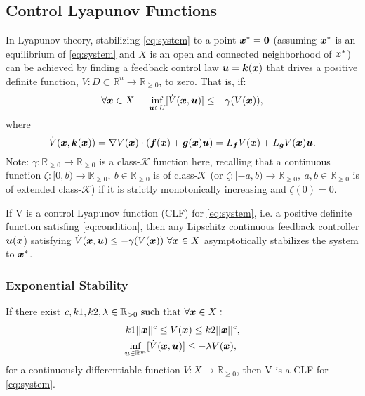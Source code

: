 \subsection{Control Lyapunov Functions}
In Lyapunov theory, stabilizing \eqref{eq:system} to a point $\boldsymbol{x}^*=\boldsymbol{0}$ (assuming 
$\boldsymbol{x}^*$ is an equilibrium of \eqref{eq:system} and 
$X$ is an open and connected neighborhood of $\boldsymbol{x}^*$) can be achieved by finding a feedback control law $\boldsymbol{u}=\boldsymbol{k}(\boldsymbol{x})$ that drives a positive definite function, $V: D \subset \mathbb{R}^n \to \mathbb{R}_{\geq 0}$, to zero. That is, if:
\begin{equation}
    \forall \boldsymbol{x}\in X ~~~~ \inf_{\boldsymbol{u}\in U}[\dot{V}(\boldsymbol{x},\boldsymbol{u})] \leq -\gamma(V(\boldsymbol{x})),
\label{eq:condition}
\end{equation}
where
\begin{equation}
    \dot{V}(\boldsymbol{x},\boldsymbol{k}(\boldsymbol{x})) = \nabla V(\boldsymbol{x})\cdot(\boldsymbol{f}(\boldsymbol{x})+\boldsymbol{g}(\boldsymbol{x})\boldsymbol{u})= L_{\boldsymbol{f}}V(\boldsymbol{x})+L_{\boldsymbol{g}}V(\boldsymbol{x})\boldsymbol{u}.
\label{eq:vdot}
\end{equation}
Note: $\gamma : \mathbb{R}_{\geq 0} \to \mathbb{R}_{\geq 0} $ is a class-$\mathcal{K}$ function here, 
recalling that a continuous function $\zeta : [0, b) \to \mathbb{R}_{\geq 0},~b \in \mathbb{R}_{\geq 0}$ is of class-$\mathcal{K}$ (or $\zeta : [-a, b) \to \mathbb{R}_{\geq 0},~a,b \in \mathbb{R}_{\geq 0}$ is of extended class-$\mathcal{K}$) if it is strictly monotonically increasing and $\zeta(0) = 0$.
\begin{theorem}\label{th:clft}
If V is a control Lyapunov function (CLF) for \eqref{eq:system}, i.e. a positive definite function satisfing \eqref{eq:condition}, then any Lipschitz continuous feedback controller $\boldsymbol{u}(\boldsymbol{x}$) satisfying $\dot{V}(\boldsymbol{x},\boldsymbol{u}) \leq -\gamma(V(\boldsymbol{x}))~\forall \boldsymbol{x}\in X$ asymptotically stabilizes the system to $\boldsymbol{x}^*$.
\end{theorem}
\subsubsection{Exponential Stability}
\begin{definition}
If there exist $c,k1,k2,\lambda \in \mathbb{R}_{> 0} \text{~such that~} \forall \boldsymbol{x} \in X:$ 
\begin{equation}
    \begin{split}
    k1||\boldsymbol{x}||^c \leq V(\boldsymbol{x}) \leq k2||\boldsymbol{x}||^c,  \\
    \inf_{{\boldsymbol{u}\in \mathbb{R}^m}}[\dot{V}(\boldsymbol{x},\boldsymbol{u})] \leq -\lambda V(\boldsymbol{x}),~
    \end{split}
    \label{eq:expstabcond}
\end{equation}
for a continuously differentiable function $V : X \to \mathbb{R}_{\geq 0}$, then V is a CLF for \eqref{eq:system}.
\label{def:expclf}
\end{definition}

